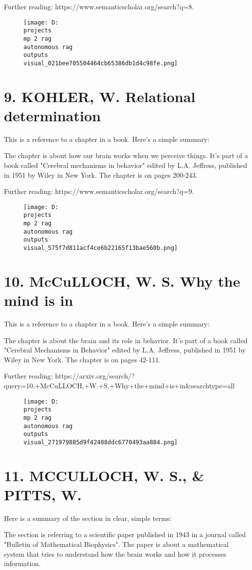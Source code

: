 \documentclass[12pt,a4paper]{article}
\begin{document}
Further reading: https://www.semanticscholar.org/search?q=8.%
\begin{figure}[h]
\centering
\texttt{[image: D:\\projects\\mp 2 rag\\autonomous rag\\outputs\\visual\_021bee705504464cb65386db1d4c98fe.png]}
\end{figure}
\section{9. KOHLER, W. Relational determination}
This is a reference to a chapter in a book. Here's a simple summary:

The chapter is about how our brain works when we perceive things. It's part of a book called "Cerebral mechanisms in behavior" edited by L.A. Jeffress, published in 1951 by Wiley in New York. The chapter is on pages 200-243.

Further reading: https://www.semanticscholar.org/search?q=9.%
\begin{figure}[h]
\centering
\texttt{[image: D:\\projects\\mp 2 rag\\autonomous rag\\outputs\\visual\_575f7d811acf4ce6b22165f13bae560b.png]}
\end{figure}
\section{10. McCuLLOCH, W. S. Why the mind is in}
This is a reference to a chapter in a book. Here's a simple summary:

The chapter is about the brain and its role in behavior. It's part of a book called "Cerebral Mechanisms in Behavior" edited by L.A. Jeffress, published in 1951 by Wiley in New York. The chapter is on pages 42-111.

Further reading: https://arxiv.org/search/?query=10.+McCuLLOCH,+W.+S.+Why+the+mind+is+in&searchtype=all
\begin{figure}[h]
\centering
\texttt{[image: D:\\projects\\mp 2 rag\\autonomous rag\\outputs\\visual\_271979885d9f42408ddc6770493aa884.png]}
\end{figure}
\section{11. MCCULLOCH, W. S., & PITTS, W.}
Here is a summary of the section in clear, simple terms:

The section is referring to a scientific paper published in 1943 in a journal called "Bulletin of Mathematical Biophysics". The paper is about a mathematical system that tries to understand how the brain works and how it processes information.
\end{document}
